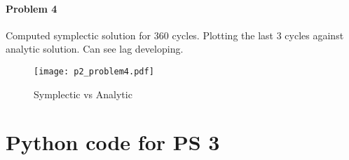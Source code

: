 \documentclass[12pt, oneside, letterpaper, fleqn]{article}
\begin{document}
\pagebreak
\paragraph{Problem 4}
Computed symplectic solution for 360 cycles. Plotting the last 3 cycles
against analytic solution. Can see lag developing.
\begin{figure}[htbp]
\caption{Symplectic vs Analytic}
\texttt{[image: p2\_problem4.pdf]}
\end{figure}

\appendix
\section{Python code for PS 3}

\end{document}
